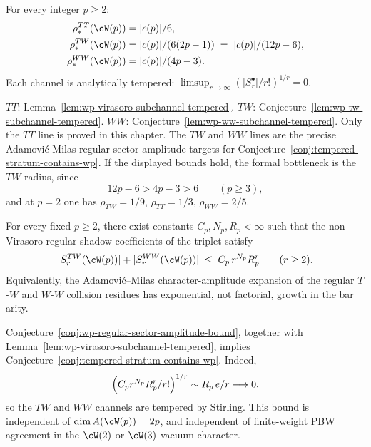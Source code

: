 \begin{conjecture}
\label{prop:wp-channel-upper-bounds}
For every integer $p \ge 2$:
\begin{align*}
 \rho_*^{TT}(\cW(p)) &= \lvert c(p) \rvert / 6, \\
 \rho_*^{TW}(\cW(p)) &= \lvert c(p) \rvert / (6 (2p - 1))
 \;=\; \lvert c(p) \rvert / (12 p - 6), \\
 \rho_*^{WW}(\cW(p)) &= \lvert c(p) \rvert / (4 p - 3).
\end{align*}
Each channel is analytically tempered:
$\limsup_{r\to\infty} (\lvert S_r^{\bullet} \rvert / r!)^{1/r} = 0$.
\end{conjecture}

\begin{remark}
$TT$: Lemma~\ref{lem:wp-virasoro-subchannel-tempered}.
$TW$: Conjecture~\ref{lem:wp-tw-subchannel-tempered}.
$WW$: Conjecture~\ref{lem:wp-ww-subchannel-tempered}.
Only the $TT$ line is proved in this chapter. The $TW$ and $WW$
lines are the precise Adamovi\'c-Milas regular-sector amplitude
targets for Conjecture~\ref{conj:tempered-stratum-contains-wp}.
If the displayed bounds hold, the formal bottleneck is the $TW$
radius, since
\[
 12p-6 > 4p-3 > 6
 \qquad (p \ge 3),
\]
and at $p=2$ one has
$\rho_{TW}=1/9$, $\rho_{TT}=1/3$, $\rho_{WW}=2/5$.
\end{remark}

\begin{conjecture}
\label{conj:wp-regular-sector-amplitude-bound}
For every fixed $p \ge 2$, there exist constants
$C_p,N_p,R_p < \infty$ such that the non-Virasoro regular shadow
coefficients of the triplet satisfy
\[
 \lvert S_r^{TW}(\cW(p)) \rvert
 +
 \lvert S_r^{WW}(\cW(p)) \rvert
 \;\le\;
 C_p\, r^{N_p} R_p^r
 \qquad (r \ge 2).
\]
Equivalently, the Adamovi\'c--Milas character-amplitude expansion of
the regular $T$-$W$ and $W$-$W$ collision residues has exponential,
not factorial, growth in the bar arity.
\end{conjecture}

\begin{remark}
Conjecture~\ref{conj:wp-regular-sector-amplitude-bound}, together with
Lemma~\ref{lem:wp-virasoro-subchannel-tempered}, implies
Conjecture~\ref{conj:tempered-stratum-contains-wp}. Indeed,
\[
 \Bigl(C_p r^{N_p}R_p^r/r!\Bigr)^{1/r}
 \sim R_p\,e/r \longrightarrow 0,
\]
so the $TW$ and $WW$ channels are tempered by Stirling. This bound is
independent of $\dim A(\cW(p)) = 2p$, and independent of finite-weight
PBW agreement in the $\cW(2)$ or $\cW(3)$ vacuum character.
\end{remark}

